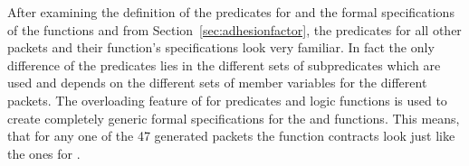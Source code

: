 After examining the definition of the predicates for 
and the formal specifications of the functions 
and  from Section~\ref{sec:adhesionfactor},
the predicates for all other packets and their function's specifications
look very familiar.
In fact the only difference of the predicates lies in the different
sets of subpredicates which are used and depends on the different sets
of member variables for the different packets.
The overloading feature of \acsl for predicates and logic functions
is used to create completely generic formal specifications for the
 and  functions.
This means, that for any one of the 47 generated packets the
function contracts look just like the ones for .

